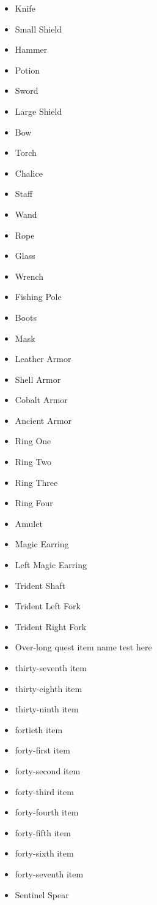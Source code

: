 \documentclass[11pt,letterpaper,oldstylefigures]{memoir}
\begin{document}
\begin{itemize}
\item Knife
\item Small Shield
\item Hammer
\item Potion
\item Sword
\item Large Shield
\item Bow
\item Torch
\item Chalice
\item Staff
\item Wand
\item Rope
\item Glass
\item Wrench
\item Fishing Pole
\item Boots
\item Mask
\item Leather Armor
\item Shell Armor
\item Cobalt Armor
\item Ancient Armor
\item Ring One
\item Ring Two
\item Ring Three
\item Ring Four
\item Amulet
\item Magic Earring
\item Left Magic Earring
\item Trident Shaft
\item Trident Left Fork
\item Trident Right Fork
\item Over-long quest item name test here
\item thirty-seventh item
\item thirty-eighth item
\item thirty-ninth item
\item fortieth item
\item forty-first item
\item forty-second item
\item forty-third item
\item forty-fourth item
\item forty-fifth item
\item forty-sixth item
\item forty-seventh item
\item Sentinel Spear

\end{itemize}
\end{document}
